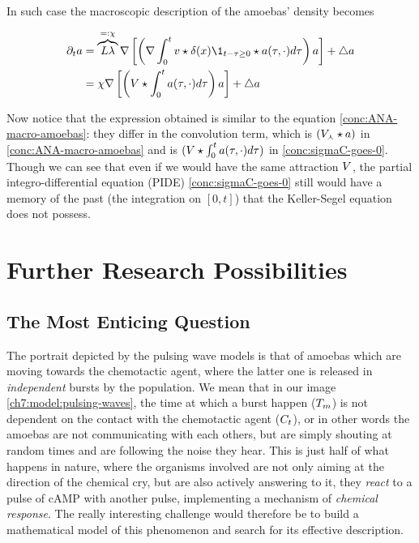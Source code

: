 In such case the macroscopic description of the amoebas' density becomes

\begin{equation}\label{conc:sigmaC-goes-0}
	\begin{aligned}
		\partial_t \adens &=  \overbrace{
			\NumCampRelease\lambda
		}^{=:\chi}
		\nabla \left[ \left( \nabla \int_0^t
		\potential \star 
		\delta(x) \1_{t-\tau\geq 0}
		\star \adens(\tau, \cdot) 
		d \tau
		\right)
		\adens
		\right]
		+
		\bigtriangleup \adens
		\\
		&=
		\chi 
		\nabla \left[ \left( 
		\attraction
		\star 
		\int_0^t
		\adens(\tau, \cdot) 
		d \tau
		\right)
		\adens
		\right]
		+
		\bigtriangleup \adens
	\end{aligned}
\end{equation}

Now notice that the expression obtained is similar to the equation \ref{conc:ANA-macro-amoebas}: they differ in the convolution term, which is $(V_\curlywedge \star a)$ in \ref{conc:ANA-macro-amoebas} and is $(V \star \int_0^t a(\tau, \cdot) d\tau)$ in \ref{conc:sigmaC-goes-0}.
Though we can see that even if we would have the same attraction $V$, the partial integro-differential equation (PIDE) \ref{conc:sigmaC-goes-0} still would have a memory of the past (the integration on $[0,t]$) that the Keller-Segel equation does not possess.

\section{Further Research Possibilities}

\subsection{The Most Enticing Question}

The portrait depicted by the pulsing wave models is that of amoebas which are moving towards the chemotactic agent, where the latter one is released in \emph{independent} bursts by the population.
We mean that in our image \ref{ch7:model:pulsing-waves}, the time at which a burst happen ($T_m$) is not dependent on the contact with the chemotactic agent ($C_t$), or in other words the amoebas are not communicating with each others, but are simply shouting at random times and are following the noise they hear.
This is just half of what happens in nature, where the organisms involved are not only aiming at the direction of the chemical cry, but are also actively answering to it, \ie they \emph{react} to a pulse of cAMP with another pulse, implementing a mechanism of \emph{chemical response}.
The really interesting challenge would therefore be to build a mathematical model of this phenomenon and search for its effective description.

